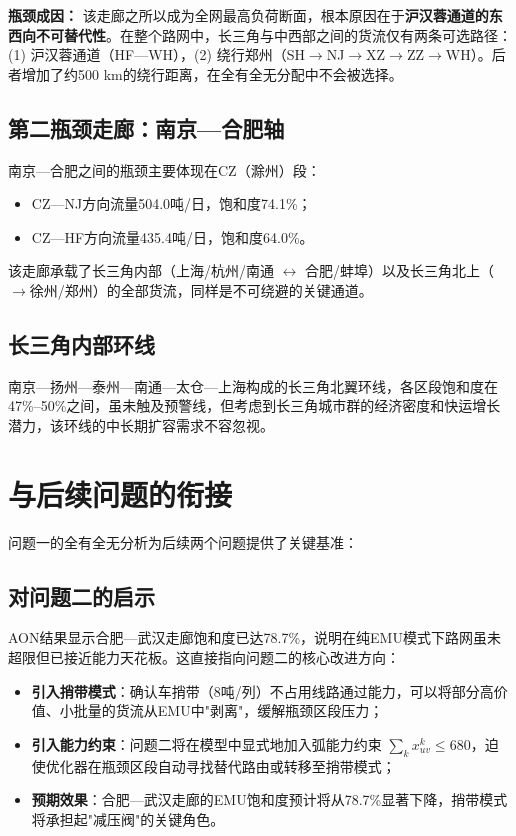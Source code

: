 \documentclass[12pt,a4paper,fontset=none]{ctexart}
\begin{document}
\textbf{瓶颈成因：} 该走廊之所以成为全网最高负荷断面，根本原因在于\textbf{沪汉蓉通道的东西向不可替代性}。在整个路网中，长三角与中西部之间的货流仅有两条可选路径：(1) 沪汉蓉通道（HF—WH），(2) 绕行郑州（SH$\to$NJ$\to$XZ$\to$ZZ$\to$WH）。后者增加了约500 km的绕行距离，在全有全无分配中不会被选择。

\subsection{第二瓶颈走廊：南京—合肥轴}

南京—合肥之间的瓶颈主要体现在CZ（滁州）段：
\begin{itemize}
    \item CZ—NJ方向流量504.0吨/日，饱和度74.1\%；
    \item CZ—HF方向流量435.4吨/日，饱和度64.0\%。
\end{itemize}

该走廊承载了长三角内部（上海/杭州/南通 $\leftrightarrow$ 合肥/蚌埠）以及长三角北上（$\to$徐州/郑州）的全部货流，同样是不可绕避的关键通道。

\subsection{长三角内部环线}

南京—扬州—泰州—南通—太仓—上海构成的长三角北翼环线，各区段饱和度在47\%--50\%之间，虽未触及预警线，但考虑到长三角城市群的经济密度和快运增长潜力，该环线的中长期扩容需求不容忽视。

\section{与后续问题的衔接}

问题一的全有全无分析为后续两个问题提供了关键基准：

\subsection{对问题二的启示}

AON结果显示合肥—武汉走廊饱和度已达78.7\%，说明在纯EMU模式下路网虽未超限但已接近能力天花板。这直接指向问题二的核心改进方向：

\begin{itemize}
    \item \textbf{引入捎带模式}：确认车捎带（8吨/列）不占用线路通过能力，可以将部分高价值、小批量的货流从EMU中"剥离"，缓解瓶颈区段压力；
    \item \textbf{引入能力约束}：问题二将在模型中显式地加入弧能力约束 $\sum_k x_{uv}^k \leq 680$，迫使优化器在瓶颈区段自动寻找替代路由或转移至捎带模式；
    \item \textbf{预期效果}：合肥—武汉走廊的EMU饱和度预计将从78.7\%显著下降，捎带模式将承担起"减压阀"的关键角色。
\end{itemize}
\end{document}
